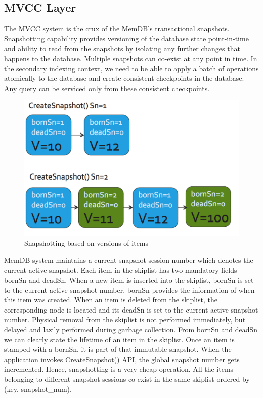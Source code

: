 \documentclass{vldb}
\begin{document}
\subsection{MVCC Layer}
The MVCC system is the crux of the MemDB’s transactional snapshots. Snapshotting capability provides versioning of the database state point-in-time and ability to read from the snapshots by isolating any further changes that happens to the database. Multiple snapshots can co-exist at any point in time. In the secondary indexing context, we need to be able to apply a batch of operations atomically to the database and create consistent checkpoints in the database. Any query can be serviced only from these consistent checkpoints.

 \begin{figure}[h]
\includegraphics[scale=0.35]{images/fig-4}
\caption{Snapshotting based on versions of items}
\label{fig:mvcc}
\end{figure}

    MemDB system maintains a current snapshot session number which denotes the current active snapshot. Each item in the skiplist has two mandatory fields bornSn and deadSn. When a new item is inserted into the skiplist, bornSn is set to the current active snapshot number. bornSn provides the information of when this item was created. When an item is deleted from the skiplist, the corresponding node is located and its deadSn is set to the current active snapshot number. Physical removal from the skiplist is not performed immediately, but delayed and lazily performed during garbage collection. From bornSn and deadSn we can clearly state the lifetime of an item in the skiplist. Once an item is stamped with a bornSn, it is part of that immutable snapshot. When the application invokes CreateSnapshot() API, the global snapshot number gets incremented. Hence, snapshotting is a very cheap operation. All the items belonging to different snapshot sessions co-exist in the same skiplist ordered by (key, snapshot\_num).
    
\end{document}
